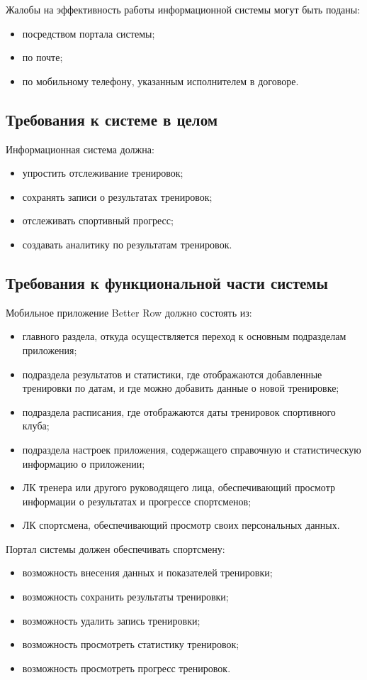 \documentclass[14pt]{extreport}
\begin{document}
Жалобы на эффективность работы информационной системы могут быть поданы:
\begin{itemize}
\item посредством портала системы;
\item по почте;
\item по мобильному телефону, указанным исполнителем в договоре.
\end{itemize}

\subsection{Требования к системе в целом}

Информационная система должна:
\begin{itemize}
\item упростить отслеживание тренировок;
\item сохранять записи о результатах тренировок;
\item отслеживать спортивный прогресс;
\item создавать аналитику по результатам тренировок.
\end{itemize}

\subsection{Требования к функциональной части системы}

Мобильное приложение Better Row должно состоять из:
\begin{itemize}
\item главного раздела, откуда осуществляется переход к основным подразделам приложения;
\item подраздела результатов и статистики, где отображаются добавленные тренировки по датам, и где можно добавить данные о новой тренировке;
\item подраздела расписания, где отображаются даты тренировок спортивного клуба;
\item подраздела настроек приложения, содержащего справочную и статистическую
информацию о приложении;
\item ЛК тренера или другого руководящего лица, обеспечивающий просмотр информации о результатах и прогрессе спортсменов;
\item ЛК спортсмена, обеспечивающий просмотр своих персональных данных.
\end{itemize}

Портал системы должен обеспечивать спортсмену:
\begin{itemize}
\item возможность внесения данных и показателей тренировки;
\item возможность сохранить результаты тренировки;
\item возможность удалить запись тренировки;
\item возможность просмотреть статистику тренировок;
\item возможность просмотреть прогресс тренировок. 
\end{itemize}
\end{document}
